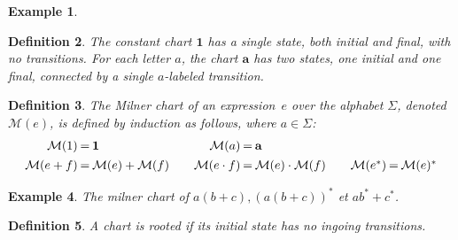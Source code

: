 \documentclass{article}
\newtheorem{definition}{Definition}[section]
\newtheorem{example}[definition]{Example}
\newcommand{\milner}[1]{\mathcal{M}(#1)}
\begin{document}
\begin{example}
\begin{center}
\end{center}
\end{example}


\begin{definition}
The constant chart $\mathbf{1}$ has a single state, both initial and final, with no transitions.  
For each letter $a$, the chart $\mathbf{a}$ has two states, one initial and one final, 
connected by a single $a$-labeled transition.
\end{definition}

\begin{definition}
The \emph{Milner chart} of an expression~$e$ over the alphabet $\Sigma$, denoted $\milner{e}$, is defined by induction as follows, 
where  $a \in \Sigma$:
\[
\begin{array}{rclcrclcrcl}
\milner{1} &\hspace{-8pt}=\hspace{-8pt}& \mathbf{1} &  &
\milner{a} &\hspace{-8pt}=\hspace{-8pt}& \mathbf{a} \\[4pt]
\milner{e+f} &\hspace{-8pt}=\hspace{-8pt}& \milner{e}+\milner{f} & &
\milner{e\cdot f} &\hspace{-8pt}=\hspace{-8pt}& \milner{e}\cdot\milner{f} & &
\milner{e^*} &\hspace{-8pt}=\hspace{-8pt}& \milner{e}^*
\end{array}
\]
\end{definition}

\begin{example} The milner chart of $a(b+c), (a(b+c))^*$ et $ab^*+c^*$.
\end{example}


\begin{definition} A chart is \emph{rooted} if its initial state has no ingoing transitions.
\end{definition}
\end{document}

